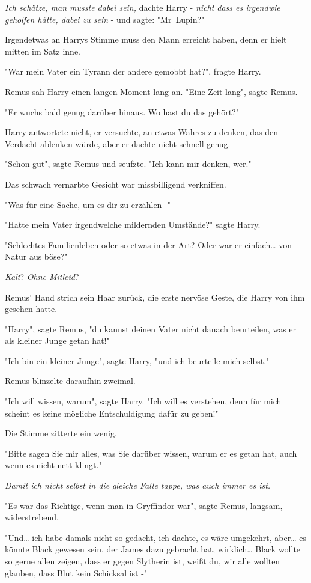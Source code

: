 {\emph{Ich schätze, man musste dabei sein,} dachte Harry - \emph{nicht dass es irgendwie geholfen hätte, dabei zu sein} - und sagte: "Mr~Lupin?"

Irgendetwas an Harrys Stimme muss den Mann erreicht haben, denn er hielt mitten im Satz inne.

"War mein Vater ein Tyrann der andere gemobbt hat?", fragte Harry.

Remus sah Harry einen langen Moment lang an. "Eine Zeit lang", sagte Remus.

"Er wuchs bald genug darüber hinaus. Wo hast du das gehört?"

Harry antwortete nicht, er versuchte, an etwas Wahres zu denken, das den Verdacht ablenken würde, aber er dachte nicht schnell genug.

"Schon gut", sagte Remus und seufzte. "Ich kann mir denken, wer."

Das schwach vernarbte Gesicht war missbilligend verkniffen.

"Was für eine Sache, um es dir zu erzählen -"

"Hatte mein Vater irgendwelche mildernden Umstände?" sagte Harry.

"Schlechtes Familienleben oder so etwas in der Art? Oder war er einfach… von Natur aus böse?"

\emph{Kalt}? \emph{Ohne Mitleid}?

Remus' Hand strich sein Haar zurück, die erste nervöse Geste, die Harry von ihm gesehen hatte.

"Harry", sagte Remus, "du kannst deinen Vater nicht danach beurteilen, was er als kleiner Junge getan hat!"

"Ich bin ein kleiner Junge", sagte Harry, "und ich beurteile mich selbst."

Remus blinzelte daraufhin zweimal.

"Ich will wissen, warum", sagte Harry. "Ich will es verstehen, denn für mich scheint es keine mögliche Entschuldigung dafür zu geben!"

Die Stimme zitterte ein wenig.

"Bitte sagen Sie mir alles, was Sie darüber wissen, warum er es getan hat, auch wenn es nicht nett klingt."

\emph{Damit ich nicht selbst in die gleiche Falle tappe, was auch immer es ist.}

"Es war das Richtige, wenn man in Gryffindor war", sagte Remus, langsam, widerstrebend.

"Und… ich habe damals nicht so gedacht, ich dachte, es wäre umgekehrt, aber… es könnte Black gewesen sein, der James dazu gebracht hat, wirklich… Black wollte so gerne allen zeigen, dass er gegen Slytherin ist, weißt du, wir alle wollten glauben, dass Blut kein Schicksal ist -"

}
